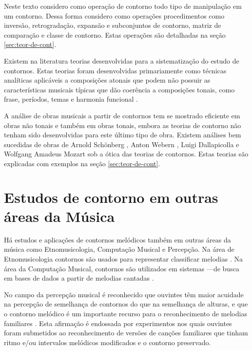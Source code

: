 Neste texto considero como operação de contorno todo tipo de
manipulação em um contorno. Dessa forma considero como operações
procedimentos como inversão, retrogradação, expansão e subconjuntos de
contorno, matriz de comparação e classe de contorno. Estas operações
são detalhadas na seção \ref{sec:teor-de-cont}.

Existem na literatura teorias desenvolvidas para a sistematização do
estudo de contornos. Estas teorias foram desenvolvidas primariamente
como técnicas analíticas aplicáveis a composições atonais que podem
não possuir as características musicais típicas que dão coerência a
composições tonais, como frase, períodos, temas e harmonia funcional
\cite[p. 1]{beard03:contour}.

A análise de obras musicais a partir de contornos tem se mostrado
eficiente em obras não tonais e também em obras tonais, embora as
teorias de contorno não tenham sido desenvolvidas para este último
tipo de obra. Existem análises bem sucedidas de obras de Arnold
Schönberg \cite{friedmann85:methodology}, Anton Webern
\cite{clifford95:contour}, Luigi Dallapicolla
\cite{marvin88:generalized} e Wolfgang Amadeus Mozart
\cite{beard03:contour} sob a ótica das teorias de contornos. Estas
teorias são explicadas com exemplos na seção \ref{sec:teor-de-cont}.

\section{Estudos de contorno em outras áreas da Música}
\label{sec:estudos-de-contorno}

Há estudos e aplicações de contornos melódicos também em outras áreas
da música como Etnomusicologia, Computação Musical e Percepção. Na
área de Etnomusicologia contornos são usados para representar
classificar melodias \cite{adams76:melodic}. Na área da Computação
Musical, contornos são utilizados em sistemas ---de busca em bases de dados a partir de melodias cantadas
\cite{ghias.ea95:query}.

No campo da percepção musical é reconhecido que ouvintes têm maior
acuidade na percepção de semelhança de contornos do que na semelhança
de alturas, e que o contorno melódico é um importante recurso para o
reconhecimento de melodias familiares \cite[p. 226,
136]{dowling.ea86:music}. Esta afirmação é endossada por experimentos
\cite{white60:recognition,dowling.ea71:contour} nos quais ouvintes
foram submetidos ao reconhecimento de versões de canções familiares
que tinham ritmo e/ou intervalos melódicos modificados e o contorno
preservado.

